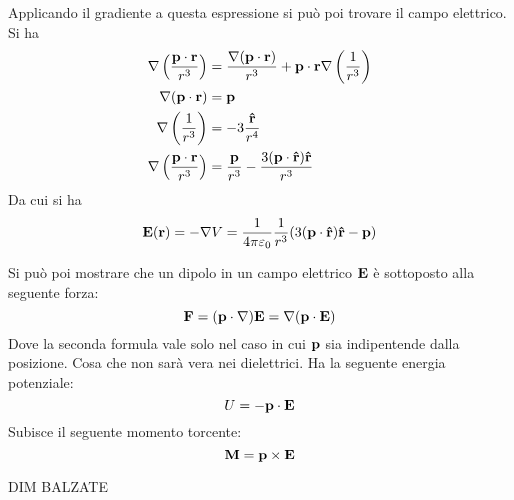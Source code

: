Applicando il gradiente a questa espressione si può poi trovare il campo elettrico. Si ha 
\begin{align*}
    \nabla \left ( \frac{ \mathbf p \cdot \mathbf r }{ r^3 } \right ) 
    &= \frac{ \nabla(\mathbf p \cdot \mathbf r) }{ r^3 } + \mathbf p \cdot \mathbf r \nabla \left ( \frac{ 1 }{ r^3 } \right ) \\
    \nabla (\mathbf p \cdot \mathbf r) &= \mathbf p \\
    \nabla \left ( \frac{ 1 }{ r^3 } \right ) &= -3 \frac{ \mathbf{\hat r } }{ r^4 } \\
    \nabla \left ( \frac{ \mathbf p \cdot \mathbf r }{ r^3 } \right )  &= \frac{ \mathbf p }{ r^3 } - \frac{ 3 ( \mathbf p \cdot \mathbf{\hat r }) \mathbf{\hat r }}{ r^3 }
\end{align*}
Da cui si ha 
\begin{equation}
    \mathbf E(\mathbf r) = -\nabla V = \frac{ 1 }{ 4\pi\varepsilon_0 } \frac{ 1 }{ r^3 } ( 3 ( \mathbf p \cdot \mathbf{\hat r }) \mathbf{\hat r }  -  \mathbf p )
\end{equation}

Si può poi mostrare che un dipolo in un campo elettrico $\mathbf E$ è sottoposto alla seguente forza:
\begin{equation}
    \mathbf F = (\mathbf p \cdot \nabla ) \mathbf E = \nabla ( \mathbf{ p \cdot E })
\end{equation}
Dove la seconda formula vale solo nel caso in cui $\mathbf p$ sia indipentende dalla posizione. Cosa che non sarà vera nei dielettrici.
Ha la seguente energia potenziale:
\begin{equation}
    U = - \mathbf{p \cdot E}
\end{equation}
Subisce il seguente momento torcente:
\begin{equation}
    \mathbf{ M = p \times E}
\end{equation}

DIM BALZATE


